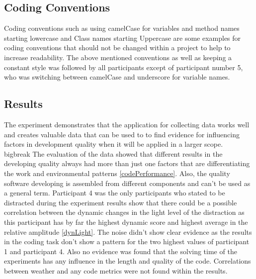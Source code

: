 \subsection{Coding Conventions}
Coding conventions such as using camelCase for variables and method names starting lowercase and Class names starting Uppercase are some examples for coding conventions that should not be changed within a project to help to increase readability. 
The above mentioned conventions as well as keeping a constant style was followed by all participants except of participant number 5, who was switching between camelCase and underscore for variable names. 

\subsection{Results}
The experiment demonstrates that the application for collecting data works well and creates valuable data that can be used to to find evidence for influencing factors in development quality when it will be applied in a larger scope. 
\\bigbreak
The evaluation of the data showed that different results in the developing quality always had more than just one factors that are differentiating the work and environmental patterns \ref{codePerformance}. Also, the quality software developing is assembled from different components and can't be used as a general term.
\bigbreak
Participant 4 was the only participants who stated to be distracted during the experiment results show that there could be a possible correlation between the dynamic changes in the light level of the distraction as this participant has by far the highest dynamic score and highest average in the relative amplitude \ref{dynLight}.
The noise didn't show clear evidence as the results in the coding task don't show a pattern for the two highest values of participant 1 and participant 4. 
Also no evidence was found that the solving time of the experiments has any influence in the length and quality of the code.
Correlations between weather and any code metrics were not found within the results.  

\FloatBarrier

